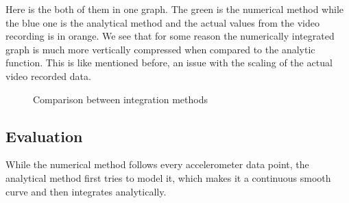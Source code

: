 \documentclass[12pt]{article}
\begin{document}
Here is the both of them in one graph. The green is the numerical method while the blue one is the analytical method and the actual values from the video recording is in orange.
We see that for some reason the numerically integrated graph is much more vertically compressed when compared to the analytic function. This is like mentioned before, an issue with the scaling of the actual video recorded data.

\begin{figure}[H]
    \caption{Comparison between integration methods}
\end{figure}

\subsection{Evaluation}
While the numerical method follows every accelerometer data point, the analytical method first tries to model it, which makes it a continuous smooth curve and then integrates analytically.
\end{document}
